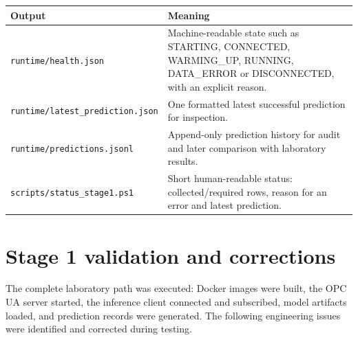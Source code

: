 \documentclass[11pt,a4paper]{article}
\newcommand{\filepath}[1]{\nolinkurl{#1}}
\begin{document}
\begin{tabularx}{\textwidth}{@{}L{3.4cm}Y@{}}
\toprule
\textbf{Output} & \textbf{Meaning} \\
\midrule
\filepath{runtime/health.json} & Machine-readable state such as STARTING, CONNECTED, WARMING\_UP, RUNNING, DATA\_ERROR or DISCONNECTED, with an explicit reason. \\
\filepath{runtime/latest_prediction.json} & One formatted latest successful prediction for inspection. \\
\filepath{runtime/predictions.jsonl} & Append-only prediction history for audit and later comparison with laboratory results. \\
\filepath{scripts/status_stage1.ps1} & Short human-readable status: collected/required rows, reason for an error and latest prediction. \\
\bottomrule
\end{tabularx}

\section{Stage 1 validation and corrections}

The complete laboratory path was executed: Docker images were built, the OPC UA server started, the inference client connected and subscribed, model artifacts loaded, and prediction records were generated. The following engineering issues were identified and corrected during testing.
\end{document}

